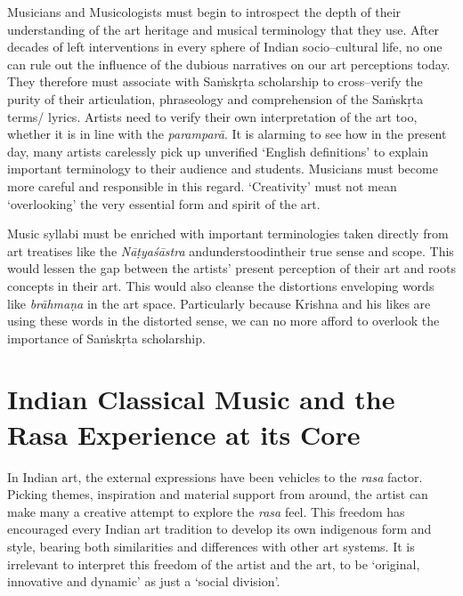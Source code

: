 Musicians and Musicologists must begin to introspect the depth of their understanding of the art heritage and musical terminology that they use. After decades of left interventions in every sphere of Indian socio–cultural life, no one can rule out the influence of the dubious narratives on our art perceptions today. They therefore must associate with Saṁskṛta scholarship to cross–verify the purity of their articulation, phraseology and comprehension of the Saṁskṛta terms/ lyrics. Artists need to verify their own interpretation of the art too, whether it is in line with the \textit{paramparā}. It is alarming to see how in the present day, many artists carelessly pick up unverified ‘English definitions’ to explain important terminology to their audience and students. Musicians must become more careful and responsible in this regard. ‘Creativity’ must not mean ‘overlooking’ the very essential form and spirit of the art.

Music syllabi must be enriched with important terminologies taken directly from art treatises like the \textit{Nāṭyaśāstra} andunderstoodintheir true sense and scope. This would lessen the gap between the artists’ present perception of their art and roots concepts in their art. This would also cleanse the distortions enveloping words like \textit{brāhmaṇa} in the art space. Particularly because Krishna and his likes are using these words in the distorted sense, we can no more afford to overlook the importance of Saṁskṛta scholarship.


\section*{Indian Classical Music and the Rasa Experience at its Core}

In Indian art, the external expressions have been vehicles to the \textit{rasa} factor. Picking themes, inspiration and material support from around, the artist can make many a creative attempt to explore the \textit{rasa} feel. This freedom has encouraged every Indian art tradition to develop its own indigenous form and style, bearing both similarities and differences with other art systems. It is irrelevant to interpret this freedom of the artist and the art, to be ‘original, innovative and dynamic’ as just a ‘social division’.

